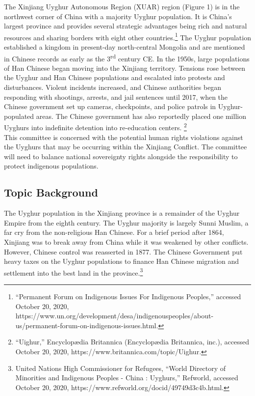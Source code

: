 \documentclass[10pt, letterpaper]{article}
\begin{document}
The Xinjiang Uyghur Autonomous Region (XUAR) region (Figure 1) is in the
northwest corner of China with a majority Uyghur population. It is
China's largest province and provides several strategic advantages being
rich and natural resources and sharing borders with eight other
countries.\footnote{``Permanent Forum on Indigenous Issues For
  Indigenous Peoples,'' accessed October 20, 2020,
  https://www.un.org/development/desa/indigenouspeoples/about-us/permanent-forum-on-indigenous-issues.html.}
The Uyghur population established a kingdom in present-day north-central
Mongolia and are mentioned in Chinese records as early as the
3\textsuperscript{rd} century CE. In the 1950s, large populations of Han
Chinese began moving into the Xinjiang territory. Tensions rose between
the Uyghur and Han Chinese populations and escalated into protests and
disturbances. Violent incidents increased, and Chinese authorities began
responding with shootings, arrests, and jail sentences until 2017, when
the Chinese government set up cameras, checkpoints, and police patrols
in Uyghur-populated areas. The Chinese government has also reportedly
placed one million Uyghurs into indefinite detention into re-education centers. \footnote{``Uighur,'' Encyclopædia Britannica
  (Encyclopædia Britannica, inc.), accessed October 20, 2020,
  https://www.britannica.com/topic/Uighur.} \\

This committee is concerned with the potential human rights violations
against the Uyghurs that may be occurring within the Xinjiang Conflict.
The committee will need to balance national sovereignty rights alongside
the responsibility to protect indigenous populations. \\

\subsection{Topic Background}

The Uyghur population in the Xinjiang province is a remainder of the
Uyghur Empire from the eighth century. The Uyghur majority is largely
Sunni Muslim, a far cry from the non-religious Han Chinese. For a brief
period after 1864, Xinjiang was to break away from China while it was
weakened by other conflicts. However, Chinese control was reasserted in
1877. The Chinese Government put heavy taxes on the Uyghur populations
to finance Han Chinese migration and settlement into the best land in
the province.\footnote{United Nations High Commissioner for Refugees,
  ``World Directory of Minorities and Indigenous Peoples - China :
  Uyghurs,'' Refworld, accessed October 20, 2020,
  https://www.refworld.org/docid/49749d3c4b.html.} \\
\end{document}
